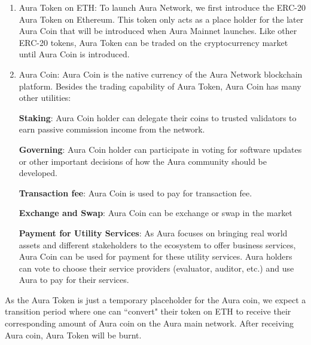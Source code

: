 \documentclass[12pt]{article}
\begin{document}
\begin{enumerate}
    \item Aura Token on ETH: To launch Aura Network, we first introduce the ERC-20 Aura Token on Ethereum. This token only acts as a place holder for the later Aura Coin that will be introduced when Aura Mainnet launches. Like other ERC-20 tokens, Aura Token can be traded on the cryptocurrency market until Aura Coin is introduced.
    \item Aura Coin: Aura Coin is the native currency of the Aura Network blockchain platform. Besides the trading capability of Aura Token, Aura Coin has many other utilities:

    \textbf{Staking}: Aura Coin holder can delegate their coins to trusted validators to earn passive commission income from the network.
    
    \textbf{Governing}: Aura Coin holder can participate in voting for software updates or other important decisions of how the Aura community should be developed.
    
    \textbf{Transaction fee}: Aura Coin is used to pay for transaction fee.
    
    \textbf{Exchange and Swap}: Aura Coin can be exchange or swap in the market
    
    \textbf{Payment for Utility Services}: As Aura focuses on bringing real world assets and different stakeholders to the ecosystem to offer business services, Aura Coin can be used for payment for these utility services. Aura holders can vote to choose their service providers (evaluator, auditor, etc.) and use Aura to pay for their services.
\end{enumerate}

As the Aura Token is just a temporary placeholder for the Aura coin, we expect a transition period where one can ``convert" their token on ETH to receive their corresponding amount of Aura coin on the Aura main network. After receiving Aura coin, Aura Token will be burnt.
\end{document}
